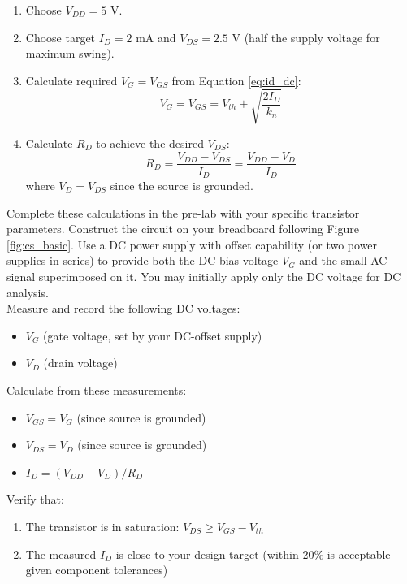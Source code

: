 \documentclass[10pt]{article}
\begin{document}
\begin{enumerate}
    \item Choose $V_{DD} = 5$ V. 
    
    \item Choose target $I_D = 2$ mA and $V_{DS} = 2.5$ V (half the supply voltage for maximum swing). 
    
    \item Calculate required $V_G = V_{GS}$ from Equation \ref{eq:id_dc}:
    \begin{equation}
        V_G = V_{GS} = V_{th} + \sqrt{\frac{2 I_D}{k_n}}
    \end{equation}
    
    \item Calculate $R_D$ to achieve the desired $V_{DS}$:
    \begin{equation}
        R_D = \frac{V_{DD} - V_{DS}}{I_D} = \frac{V_{DD} - V_D}{I_D}
    \end{equation}
    where $V_D = V_{DS}$ since the source is grounded.
    
\end{enumerate}

Complete these calculations in the pre-lab with your specific transistor parameters.  Construct the circuit on your breadboard following Figure \ref{fig:cs_basic}. Use a DC power supply with offset capability (or two power supplies in series) to provide both the DC bias voltage $V_G$ and the small AC signal superimposed on it. You may initially apply only the DC voltage for DC analysis.  \\

Measure and record the following DC voltages: 

\begin{itemize}
    \item $V_G$ (gate voltage, set by your DC-offset supply)
    \item $V_D$ (drain voltage)
\end{itemize}

Calculate from these measurements: 

\begin{itemize}
    \item $V_{GS} = V_G$ (since source is grounded)
    \item $V_{DS} = V_D$ (since source is grounded)
    \item $I_D = (V_{DD} - V_D)/R_D$
\end{itemize}

Verify that: 
\begin{enumerate}
    \item The transistor is in saturation:  $V_{DS} \geq V_{GS} - V_{th}$
    \item The measured $I_D$ is close to your design target (within 20\% is acceptable given component tolerances)
\end{enumerate}
\end{document}
